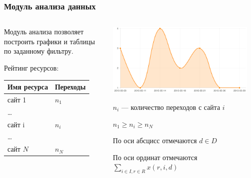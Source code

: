 \documentclass{beamer}
\begin{document}
\begin{frame}
\frametitle{Модуль анализа данных}
\begin{columns}[T]
\begin{column}{0.30\textwidth}
Модуль анализа позволяет построить графики и таблицы по заданному фильтру.

\vspace{1.5cm}

Рейтинг ресурсов:
\begin{tabular}{|l|l|}
\hline
Имя ресурса & Переходы\\
\hline
сайт 1 & $n_1$\\
\hline
\dots & \\
\hline
сайт i & $n_i$\\
\hline
\dots & \\
\hline
сайт $N$ & $n_{N}$\\
\hline
\end{tabular}
\end{column}
\begin{column}{0.70\textwidth}
\vspace{0.2cm}
\includegraphics[width=0.95\textwidth]{images/chart}

\hspace{1cm} $n_i$ --- количество переходов с сайта $i$

\hspace{1cm} $n_1 \geq n_i \geq n_{N}$


\hspace{1cm} По оси абсцисс отмечаются $d \in D$

\hspace{1cm} По оси ординат отмечаются $\sum\limits_{i \in I, r \in R} x (r,i,d)$

\end{column}
\end{columns}
\end{frame}
\end{document}
